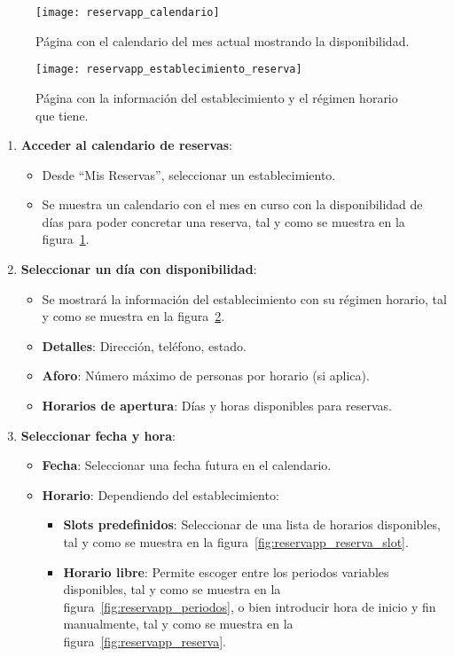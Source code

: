 \begin{figure}[H]
	\centering
	\texttt{[image: reservapp\_calendario]}
	\caption{Página con el calendario del mes actual mostrando la disponibilidad.}
	\label{fig:reservapp_calendario}
\end{figure}

\begin{figure}[H]
	\centering
		\texttt{[image: reservapp\_establecimiento\_reserva]}
	\caption{Página con la información del establecimiento y el régimen horario que tiene.}
	\label{fig:reservapp_establecimiento_reserva}
\end{figure}

\begin{enumerate}
   \item \textbf{Acceder al calendario de reservas}:
   \begin{itemize}
      \item Desde ``Mis Reservas'', seleccionar un establecimiento.
      \item Se muestra un calendario con el mes en curso con la disponibilidad de días para poder concretar una reserva, tal y como se muestra en la figura~\ref{fig:reservapp_calendario}.
   \end{itemize}
   \item \textbf{Seleccionar un día con disponibilidad}:
   \begin{itemize}
      \item Se mostrará la información del establecimiento con su régimen horario, tal y como se muestra en la figura~\ref{fig:reservapp_establecimiento_reserva}.
      \item \textbf{Detalles}: Dirección, teléfono, estado.
      \item \textbf{Aforo}: Número máximo de personas por horario (si aplica).
      \item \textbf{Horarios de apertura}: Días y horas disponibles para reservas.
   \end{itemize}
   \item \textbf{Seleccionar fecha y hora}:
   \begin{itemize}
      \item \textbf{Fecha}: Seleccionar una fecha futura en el calendario.
      \item \textbf{Horario}: Dependiendo del establecimiento:
      \begin{itemize}
         \item \textbf{Slots predefinidos}: Seleccionar de una lista de horarios disponibles, tal y como se muestra en la figura~\ref{fig:reservapp_reserva_slot}.
         \item \textbf{Horario libre}: Permite escoger entre los periodos variables disponibles, tal y como se muestra en la figura~\ref{fig:reservapp_periodos}, o bien introducir hora de inicio y fin manualmente, tal y como se muestra en la figura~\ref{fig:reservapp_reserva}.
      \end{itemize}
   \end{itemize}


\end{enumerate}
